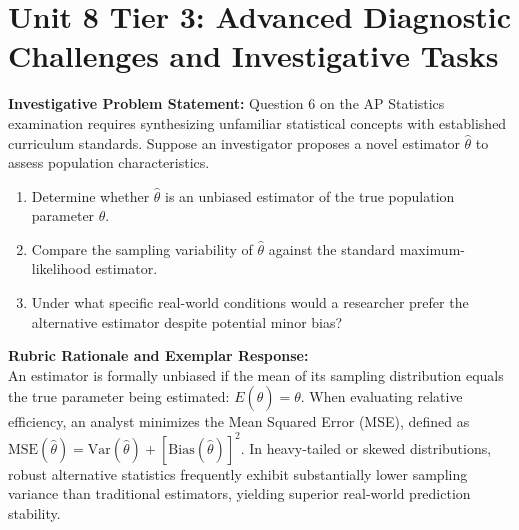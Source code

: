 \section{Unit 8 Tier 3: Advanced Diagnostic Challenges and Investigative Tasks}
\begin{frqrubricbox}
\textbf{Investigative Problem Statement:} Question 6 on the AP Statistics examination requires synthesizing unfamiliar statistical concepts with established curriculum standards. Suppose an investigator proposes a novel estimator $\hat{\theta}$ to assess population characteristics.
\begin{enumerate}[label=(\alph*)]
  \item Determine whether $\hat{\theta}$ is an unbiased estimator of the true population parameter $\theta$.
  \item Compare the sampling variability of $\hat{\theta}$ against the standard maximum-likelihood estimator.
  \item Under what specific real-world conditions would a researcher prefer the alternative estimator despite potential minor bias?
\end{enumerate}
\textbf{Rubric Rationale and Exemplar Response:}\\
An estimator is formally unbiased if the mean of its sampling distribution equals the true parameter being estimated: $E(\hat{\theta}) = \theta$. When evaluating relative efficiency, an analyst minimizes the Mean Squared Error (MSE), defined as $\text{MSE}(\hat{\theta}) = \text{Var}(\hat{\theta}) + [\text{Bias}(\hat{\theta})]^2$. In heavy-tailed or skewed distributions, robust alternative statistics frequently exhibit substantially lower sampling variance than traditional estimators, yielding superior real-world prediction stability.
\end{frqrubricbox}\vspace{6pt}
